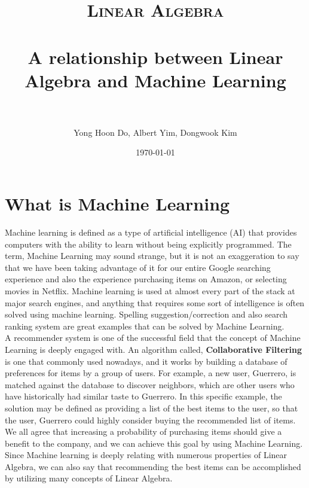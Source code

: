 \documentclass[paper=a4, fontsize=11pt]{scrartcl} %
\title{
\normalfont \normalsize
\textsc{Linear Algebra} \\ [25pt] %
\horrule{0.5pt} \\[0.4cm] %
\huge A relationship between Linear Algebra and Machine Learning \\
\horrule{2pt} \\[0.5cm] %
}
\author{Yong Hoon Do, Albert Yim, Dongwook Kim} %
\date{\normalsize\today} %
\numberwithin{equation}{section} %
\numberwithin{figure}{section} %
\numberwithin{table}{section} %
\begin{document}
\maketitle %

\section{What is Machine Learning}

Machine learning is defined as a type of artificial intelligence (AI) that provides computers
with the ability to learn without being explicitly programmed.
The term, Machine Learning may sound strange, but it is not an exaggeration to say that
we have been taking advantage of it for our entire Google searching experience
and also the experience purchasing items on Amazon, or selecting movies in Netflix.
Machine learning is used at almost every part of the stack at major search engines, and
anything that requires some sort of intelligence is often solved using machine learning.
Spelling suggestion/correction and also search ranking system are great examples that can be solved by Machine Learning. \\

A recommender system is one of the successful field that the concept of Machine Learning is deeply engaged with.
An algorithm called, \textbf{Collaborative Filtering} is one that commonly used nowadays,
and it works by building a database of preferences for items by a group of users.
For example, a new user, Guerrero, is matched against the database to discover neighbors,
which are other users who have historically had similar taste to Guerrero.
In this specific example, the solution may be defined as providing
a list of the best items to the user, so that the user, Guerrero could highly consider buying the recommended list of items.
We all agree that increasing a probability of purchasing items should give a benefit to the company, and
we can achieve this goal by using Machine Learning. \\

Since Machine learning is deeply relating with numerous properties of Linear Algebra,
we can also say that recommending the best items can be accomplished by utilizing many concepts of Linear Algebra.

\end{document}
